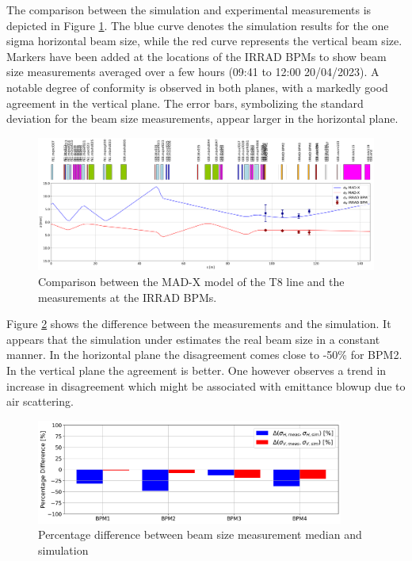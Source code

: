 The comparison between the simulation and experimental measurements is depicted in Figure \ref{fig:IRRAD_new_optics_sim_meas_comparison}. The blue curve denotes the simulation results for the one sigma horizontal beam size, while the red curve represents the vertical beam size. Markers have been added at the locations of the IRRAD BPMs to show beam size measurements averaged over a few hours (09:41 to 12:00 20/04/2023). A notable degree of conformity is observed in both planes, with a markedly good agreement in the vertical plane. The error bars, symbolizing the standard deviation for the beam size measurements, appear larger in the horizontal plane.

\begin{figure}[htbp]
\centering
\includegraphics[width=1.0\textwidth]{03_Empirical_Measurements/images/t8_optics_with_measurement_zoom.png}
\caption{Comparison between the MAD-X model of the T8 line and the measurements at the IRRAD BPMs.}
\label{fig:IRRAD_new_optics_sim_meas_comparison}
\end{figure}

Figure \ref{fig:error_irrad_sim} shows the difference between the measurements and the simulation. It appears that the simulation under estimates the real beam size in a constant manner. In the horizontal plane the disagreement comes close to -50\% for BPM2. In the vertical plane the agreement is better. One however observes a trend in increase in disagreement which might be associated with emittance blowup due to air scattering.

\begin{figure}[htbp]
\centering
\includegraphics[width=0.9\textwidth]{03_Empirical_Measurements/images/percentage_diff_btw_sigma_meas_and_sim.png}
\caption{Percentage difference between beam size measurement median and simulation}
\label{fig:error_irrad_sim}
\end{figure}

